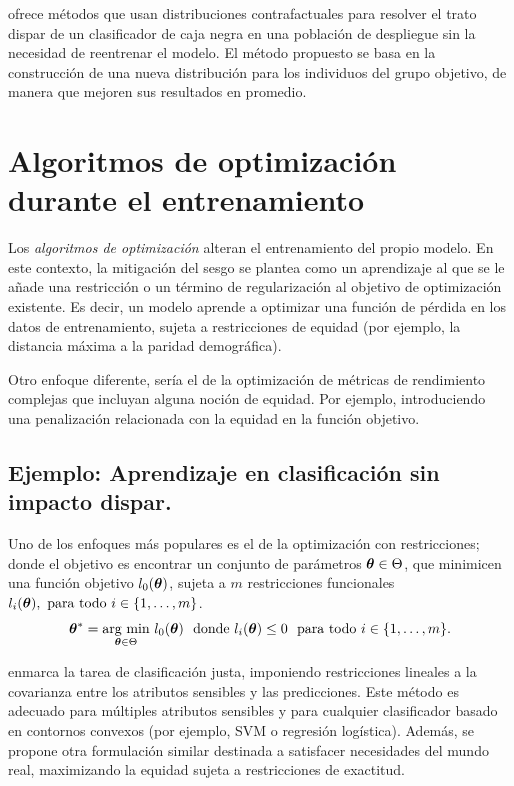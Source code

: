\documentclass[oneside,openright,titlepage,numbers=noenddot,openany,headinclude,footinclude=true,
cleardoublepage=empty,abstractoff,BCOR=5mm,paper=a4,fontsize=12pt,main=spanish]{scrreprt}
\begin{document}
\cite{repairing2019} ofrece métodos que usan distribuciones contrafactuales para resolver el trato dispar de un clasificador de caja negra en una población de despliegue sin la necesidad de reentrenar el modelo. El método propuesto se basa en la construcción de una nueva distribución para los individuos del grupo objetivo, de manera que mejoren sus resultados en promedio.

\section{Algoritmos de optimización durante el entrenamiento}

Los \textit{algoritmos de optimización} alteran el entrenamiento del propio modelo. En este contexto, la mitigación del sesgo se plantea como un aprendizaje al que se le añade una restricción o un término de regularización al objetivo de optimización existente. Es decir, un modelo aprende a optimizar una función de pérdida en los datos de entrenamiento, sujeta a restricciones de equidad (por ejemplo, la distancia máxima a la paridad demográfica).

Otro enfoque diferente, sería el de la optimización de métricas de rendimiento complejas que incluyan alguna noción de equidad. Por ejemplo, introduciendo una penalización relacionada con la equidad en la función objetivo.

\subsection{Ejemplo: Aprendizaje en clasificación sin impacto dispar.}

Uno de los enfoques más populares es el de la optimización con restricciones; donde el objetivo es encontrar un conjunto de parámetros $\bm{\theta} \in \Theta$, que minimicen una función objetivo $l_0(\bm{\theta})$, sujeta a $m$ restricciones funcionales $l_i(\btheta), \ \text{para todo} \ i \in \{1,\dots,m\}$. $$\bm{\theta}^\ast = \underset{\bm{\theta} \in \Theta}{\text{arg min}}  \ l_0(\bm{\theta}) \ \ \text{donde} \ l_i(\bm{\theta}) \leq 0 \ \ \text{para todo} \ i \in \{1,\dots,m\}.$$

\cite{constraints2017} enmarca la tarea de clasificación justa, imponiendo restricciones lineales a la covarianza entre los atributos sensibles y las predicciones. Este método es adecuado para múltiples atributos sensibles y para cualquier clasificador basado en contornos convexos (por ejemplo, SVM o regresión logística). Además, se propone otra formulación similar destinada a satisfacer necesidades del mundo real, maximizando la equidad sujeta a restricciones de exactitud. 
\end{document}
